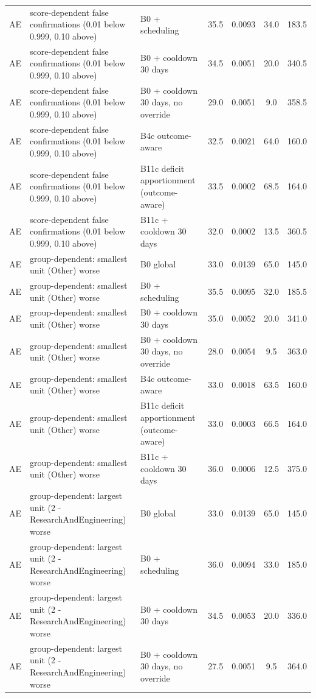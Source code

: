 \begin{longtable}{lp{5.2cm}p{4.4cm}cccc}
AE & score-dependent false confirmations (0.01 below 0.999, 0.10 above) & B0 + scheduling & 35.5 & 0.0093 & 34.0 & 183.5 \\
AE & score-dependent false confirmations (0.01 below 0.999, 0.10 above) & B0 + cooldown 30 days & 34.5 & 0.0051 & 20.0 & 340.5 \\
AE & score-dependent false confirmations (0.01 below 0.999, 0.10 above) & B0 + cooldown 30 days, no override & 29.0 & 0.0051 & 9.0 & 358.5 \\
AE & score-dependent false confirmations (0.01 below 0.999, 0.10 above) & B4c outcome-aware & 32.5 & 0.0021 & 64.0 & 160.0 \\
AE & score-dependent false confirmations (0.01 below 0.999, 0.10 above) & B11c deficit apportionment (outcome-aware) & 33.5 & 0.0002 & 68.5 & 164.0 \\
AE & score-dependent false confirmations (0.01 below 0.999, 0.10 above) & B11c + cooldown 30 days & 32.0 & 0.0002 & 13.5 & 360.5 \\
AE & group-dependent: smallest unit (Other) worse & B0 global & 33.0 & 0.0139 & 65.0 & 145.0 \\
AE & group-dependent: smallest unit (Other) worse & B0 + scheduling & 35.5 & 0.0095 & 32.0 & 185.5 \\
AE & group-dependent: smallest unit (Other) worse & B0 + cooldown 30 days & 35.0 & 0.0052 & 20.0 & 341.0 \\
AE & group-dependent: smallest unit (Other) worse & B0 + cooldown 30 days, no override & 28.0 & 0.0054 & 9.5 & 363.0 \\
AE & group-dependent: smallest unit (Other) worse & B4c outcome-aware & 33.0 & 0.0018 & 63.5 & 160.0 \\
AE & group-dependent: smallest unit (Other) worse & B11c deficit apportionment (outcome-aware) & 33.0 & 0.0003 & 66.5 & 164.0 \\
AE & group-dependent: smallest unit (Other) worse & B11c + cooldown 30 days & 36.0 & 0.0006 & 12.5 & 375.0 \\
AE & group-dependent: largest unit (2 - ResearchAndEngineering) worse & B0 global & 33.0 & 0.0139 & 65.0 & 145.0 \\
AE & group-dependent: largest unit (2 - ResearchAndEngineering) worse & B0 + scheduling & 36.0 & 0.0094 & 33.0 & 185.0 \\
AE & group-dependent: largest unit (2 - ResearchAndEngineering) worse & B0 + cooldown 30 days & 34.5 & 0.0053 & 20.0 & 336.0 \\
AE & group-dependent: largest unit (2 - ResearchAndEngineering) worse & B0 + cooldown 30 days, no override & 27.5 & 0.0051 & 9.5 & 364.0 \\

\end{longtable}
